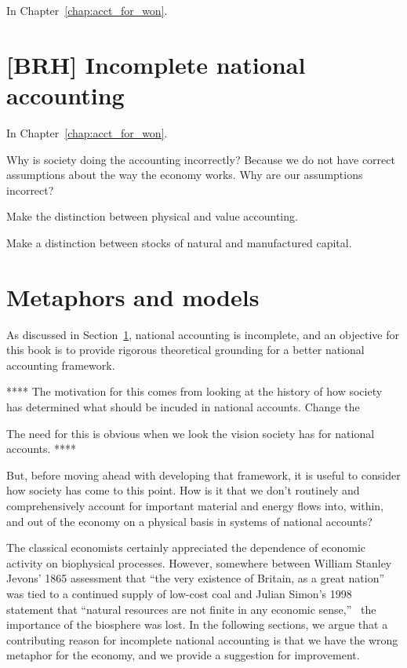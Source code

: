 In Chapter~\ref{chap:acct_for_won}.



\section{[BRH] Incomplete national accounting}
\label{sec:incomplete_accounting}

In Chapter~\ref{chap:acct_for_won}.



Why is society doing the accounting incorrectly? 
Because we do not have correct assumptions about the way the economy works. 
Why are our assumptions incorrect? 

Make the distinction between physical and value accounting.

Make a distinction between stocks of natural and manufactured capital.


\section{Metaphors and models}
\label{sec:metaphors_and_models}

As discussed in Section~\ref{sec:incomplete_accounting}, 
national accounting is incomplete, and
an objective for this book is to provide rigorous theoretical grounding for 
a better national accounting framework.

**** The motivation for this comes from looking at the history
of how society has determined what should be incuded in national accounts. 
Change the 

The need for this is obvious when we look the vision society has for national accounts.
****

But, before moving ahead with developing that framework,
it is useful to consider how society has come to this point.
How is it that we don't routinely and comprehensively account for
important material and energy flows into, within, and out of the economy
on a physical basis in systems of national accounts?

The classical economists certainly appreciated the dependence of
economic activity on biophysical processes.\cite{Hall2011, Cleveland1987, Dale2012}
However, somewhere between William Stanley Jevons' 1865
assessment that
``the very existence of Britain, as a great nation''~\cite[IV.3]{Jevons1865}
was tied to a continued supply of low-cost coal 
and Julian Simon's 1998 statement that
``natural resources are not finite in any economic sense,''~\cite[p.~54]{Simon1998} %
the importance of the biosphere was lost.
In the following sections, we argue that
a contributing reason for incomplete national accounting
is that we have the wrong metaphor for the economy,
and we provide a suggestion for improvement.


